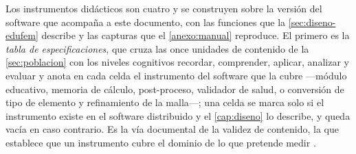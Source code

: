 Los instrumentos didácticos son cuatro y se construyen sobre la versión del software que acompaña a este documento, con las funciones que la \autoref{sec:diseno-edufem} describe y las capturas que el \autoref{anexo:manual} reproduce. El primero es la \emph{tabla de especificaciones}, que cruza las once unidades de contenido de la \autoref{sec:poblacion} con los niveles cognitivos recordar, comprender, aplicar, analizar y evaluar \autocite{anderson2001taxonomy} %
y anota en cada celda el instrumento del software que la cubre —módulo educativo, memoria de cálculo, post-proceso, validador de salud, o conversión de tipo de elemento y refinamiento de la malla—; una celda se marca solo si el instrumento existe en el software distribuido y el \autoref{cap:diseno} lo describe, y queda vacía en caso contrario. Es la vía documental de la validez de contenido, la que establece que un instrumento cubre el dominio de lo que pretende medir \autocite{sampieri2018metodologia}. %

